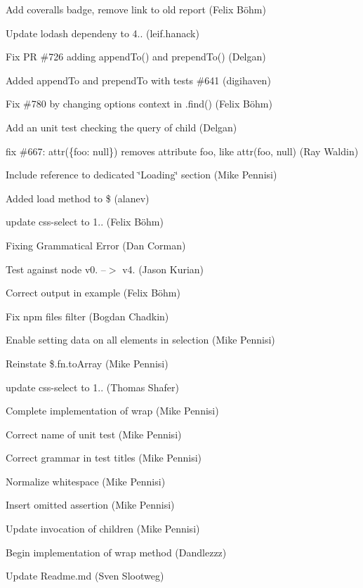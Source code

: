 \begin{DoxyItemize}
\item Add coveralls badge, remove link to old report (Felix Böhm)
\item Update lodash dependeny to 4.. (leif.\+hanack)
\item Fix PR \#726 adding \textquotesingle{}append\+To()\textquotesingle{} and \textquotesingle{}prepend\+To()\textquotesingle{} (Delgan)
\item Added append\+To and prepend\+To with tests \#641 (digihaven)
\item Fix \#780 by changing options context in \textquotesingle{}.find()\textquotesingle{} (Felix Böhm)
\item Add an unit test checking the query of child (Delgan)
\item fix \#667\+: attr(\{foo\+: null\}) removes attribute foo, like attr(\textquotesingle{}foo\textquotesingle{}, null) (Ray Waldin)
\item Include reference to dedicated \char`\"{}\+Loading\char`\"{} section (Mike Pennisi)
\item Added load method to \$ (alanev)
\item update css-\/select to 1.. (Felix Böhm)
\item Fixing Grammatical Error (Dan Corman)
\item Test against node v0. --$>$ v4. (Jason Kurian)
\item Correct output in example (Felix Böhm)
\item Fix npm files filter (Bogdan Chadkin)
\item Enable setting data on all elements in selection (Mike Pennisi)
\item Reinstate {\ttfamily \$.fn.\+to\+Array} (Mike Pennisi)
\item update css-\/select to 1.. (Thomas Shafer)
\item Complete implementation of {\ttfamily wrap} (Mike Pennisi)
\item Correct name of unit test (Mike Pennisi)
\item Correct grammar in test titles (Mike Pennisi)
\item Normalize whitespace (Mike Pennisi)
\item Insert omitted assertion (Mike Pennisi)
\item Update invocation of {\ttfamily children} (Mike Pennisi)
\item Begin implementation of {\ttfamily wrap} method (Dandlezzz)
\item Update Readme.\+md (Sven Slootweg)

\end{DoxyItemize}
